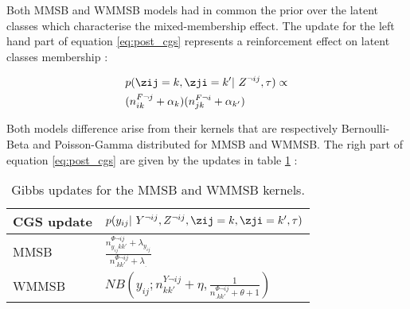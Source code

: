 Both MMSB and WMMSB models had in common the prior over the latent classes which characterise the mixed-membership effect. The update for the left hand part of equation \eqref{eq:post_cgs} represents a reinforcement effect on latent classes membership :

\begin{align*}
    & p(\zij=k, \zji=k' | Z^{\neg ij}, \tau) \propto  \nonumber\\
    & (n^{F\neg j}_{ik} + \alpha_k) (n^{F\neg i}_{jk} + \alpha_{k'}) 
\end{align*}


Both models difference arise from their kernels that are respectively Bernoulli-Beta and Poisson-Gamma distributed for MMSB and WMMSB. The righ part of equation \eqref{eq:post_cgs} are given by the updates in table \ref{table:cgs} :

%
%
\begin{table}[h] \label{table:cgs}
\caption{Gibbs updates for the MMSB and WMMSB kernels.}

    \begin{tabular}{ll}
    \hline
    CGS update    & $p(y_{ij} | Y^{\neg ij}, Z^{\neg ij}, \zij=k, \zji=k', \tau)$ \\
    \hline
    MMSB  & $\frac{ n^{\Phi\neg ij}_{y_{ij}kk'} + \lambda_{y_{ij}}}{n^{\Phi\neg ij}_{\bm{.}kk'} + \lambda_{\bm{.}}}$ \\
    WMMSB & $NB(y_{ij}; n^{Y\neg ij}_{kk'} + \eta, \frac{1}{n^{\Phi\neg ij}_{\bm{.}kk'} + \theta + 1} )$ \\
    \hline
    \end{tabular}
\end{table}


